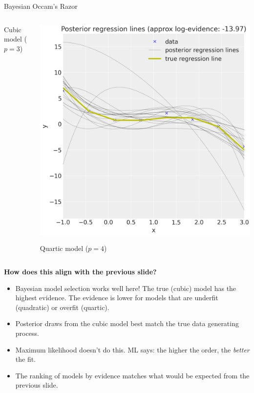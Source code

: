 \documentclass[10pt]{beamer}
\begin{document}
\begin{frame}{Bayesian Occam's Razor}
\begin{columns}
\begin{column}{0.33\textwidth}
            Cubic model ($p=3$)
        \end{column}
        \begin{column}{0.33\textwidth}
            \includegraphics[width=\columnwidth]{images/bayesian_regression_fourth_order_model}%
            
              Quartic model ($p=4$)
        \end{column}
    \end{columns}

\vfill 

{\scriptsize
\textbf{How does this align with the previous slide?} \pause 
\begin{itemize}
\item Bayesian model selection works well here!  The true (cubic) model has the highest evidence.  The evidence is lower for models that are underfit (quadratic) or overfit (quartic).
\item Posterior draws from the cubic model best match the true data generating process.
\item Maximum likelihood doesn't do this.  ML says: the higher the order, the \textit{better} the fit. 
\item The ranking of models by evidence matches what would be expected from the previous slide.

\end{itemize}
}

\end{frame}
\end{document}
